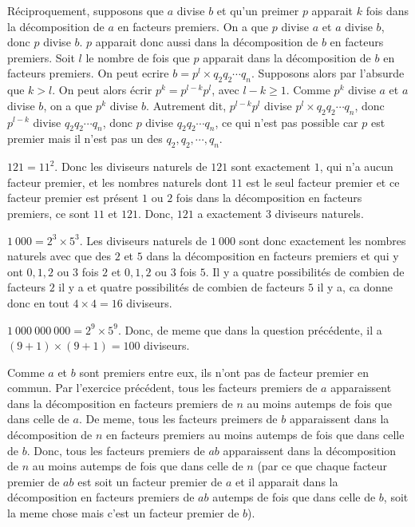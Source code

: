 Réciproquement, supposons que \(a\) divise \(b\) et qu'un preimer \(p\) apparait \(k\) fois dans la décomposition de \(a\) en facteurs premiers. On a que \(p\) divise \(a\) et \(a\) divise \(b\), donc \(p\) divise \(b\). \(p\) apparait donc aussi dans la décomposition de \(b\) en facteurs premiers. Soit \(l\) le nombre de fois que \(p\) apparait dans la décomposition de \(b\) en facteurs premiers. On peut ecrire \(b = p^{l} \times q_2 q_2 \cdots q_{n}\). Supposons alors par l'absurde que \(k > l\). On peut alors écrir \(p^{k} = p^{l-k} p^{l}\), avec \(l-k \geqslant 1\). Comme \(p^{k}\) divise \(a\) et \(a\) divise \(b\), on a que \(p^{k}\) divise \(b\). Autrement dit, \(p^{l-k} p^{l}\) divise \(p^{l} \times q_2 q_2 \cdots q_{n}\), donc \(p^{l-k}\) divise \(q_2 q_2 \cdots q_{n}\), donc \(p\) divise \(q_2 q_2 \cdots q_{n}\), ce qui n'est pas possible car \(p\) est premier mais il n'est pas un des \(q_2 , q_2 , \cdots , q_{n}\).

\sol

\(121 = 11^2\). Donc les diviseurs naturels de \(121\) sont exactement \(1\), qui n'a aucun facteur premier, et les nombres naturels dont \(11\) est le seul facteur premier et ce facteur premier est présent \(1\) ou \(2\) fois dans la décomposition en facteurs premiers, ce sont \(11\) et \(121\). Donc, \(121\) a exactement \(3\) diviseurs naturels.

\(1\ 000 = 2^{3} \times 5^{3}\). Les diviseurs naturels de \(1\ 000\) sont donc exactement les nombres naturels avec que des \(2\) et \(5\) dans la décomposition en facteurs premiers et qui y ont \(0, 1, 2\) ou \(3\) fois \(2\) et \(0, 1, 2\) ou \(3\) fois \(5\). Il y a quatre possibilités de combien de facteurs \(2\) il y a et quatre possibilités
de combien de facteurs \(5\) il y a, ca donne donc en tout \(4 \times 4 = 16\) diviseurs.

\(1\ 000\ 000\ 000 = 2^{9} \times 5^{9}\). Donc, de meme que dans la question précédente, il a \(\left(9+1\right)\times\left(9+1\right) = 100\) diviseurs.

\sol

Comme \(a\) et \(b\) sont premiers entre eux, ils n'ont pas de facteur premier en commun. Par l'exercice précédent, tous les facteurs premiers de \(a\) apparaissent dans la décomposition en facteurs premiers de \(n\) au moins autemps de fois que dans celle de \(a\). De meme, tous les facteurs preimers de \(b\) apparaissent dans la décomposition de \(n\) en facteurs premiers au moins autemps de fois que dans celle de \(b\). Donc, tous les facteurs premiers de \(ab\) apparaissent dans la décomposition de \(n\) au moins autemps de fois que dans celle de \(n\) (par ce que chaque facteur premier de \(ab\) est soit un facteur premier de \(a\) et il apparait dans la décomposition en facteurs premiers de \(ab\) autemps de fois que dans celle de \(b\), soit la meme chose mais c'est un facteur premier de \(b\)).

